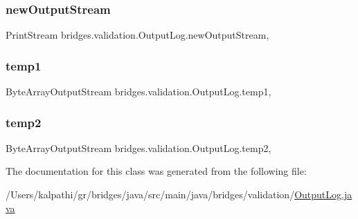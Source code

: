 \subsubsection{\texorpdfstring{newOutputStream}{newOutputStream}}
{\footnotesize\ttfamily Print\+Stream bridges.\+validation.\+Output\+Log.\+new\+Output\+Stream\hspace{0.3cm}{\ttfamily [static]}, {\ttfamily [protected]}}

\mbox{\label{classbridges_1_1validation_1_1_output_log_a142611812dd1ea095c4a1274bd40a93a}} 
\subsubsection{\texorpdfstring{temp1}{temp1}}
{\footnotesize\ttfamily Byte\+Array\+Output\+Stream bridges.\+validation.\+Output\+Log.\+temp1\hspace{0.3cm}{\ttfamily [static]}, {\ttfamily [protected]}}

\mbox{\label{classbridges_1_1validation_1_1_output_log_ab1f0ab7e9ada60f29c4c4f59694c1163}} 
\subsubsection{\texorpdfstring{temp2}{temp2}}
{\footnotesize\ttfamily Byte\+Array\+Output\+Stream bridges.\+validation.\+Output\+Log.\+temp2\hspace{0.3cm}{\ttfamily [static]}, {\ttfamily [protected]}}



The documentation for this class was generated from the following file\+:\begin{DoxyCompactItemize}
\item 
/\+Users/kalpathi/gr/bridges/java/src/main/java/bridges/validation/\mbox{\hyperlink{_output_log_8java}{Output\+Log.\+java}}\end{DoxyCompactItemize}
